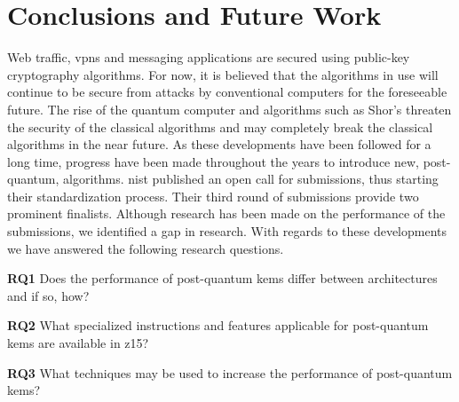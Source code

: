 \chapter{Conclusions and Future Work}
\label{chapter:conclusion}

\noindent Web traffic, \glspl{vpn} and messaging applications are secured using public-key cryptography algorithms. For now, it is believed that the algorithms in use will continue to be secure from attacks by conventional computers for the foreseeable future. The rise of the quantum computer and algorithms such as Shor's threaten the security of the classical algorithms and may completely break the classical algorithms in the near future. As these developments have been followed for a long time, progress have been made throughout the years to introduce new, \gls{post-quantum}, algorithms. \acrfull{nist} published an open call for submissions, thus starting their standardization process. Their third round of submissions provide two prominent finalists. Although research has been made on the performance of the submissions, we identified a gap in research. With regards to these developments we have answered the following research questions.

\begin{description}
    \item \textbf{RQ1} Does the performance of \gls{post-quantum} \glspl{kem} differ between architectures and if so, how?
    
    \item \textbf{RQ2} What specialized instructions and features applicable for \gls{post-quantum} \glspl{kem} are available in \gls{z15}?
    
    \item \textbf{RQ3} What techniques may be used to increase the performance of \gls{post-quantum} \glspl{kem}?
\end{description}


